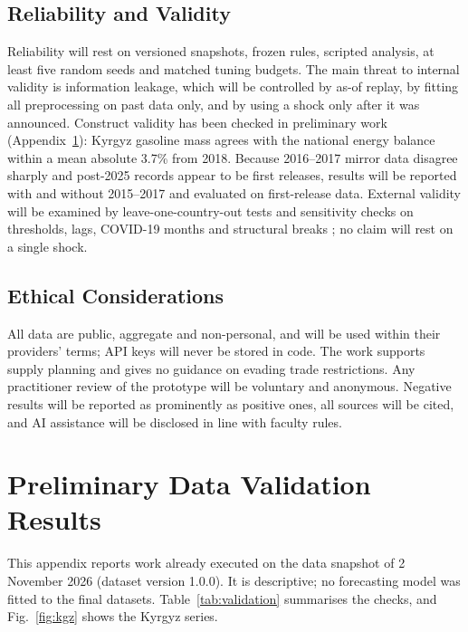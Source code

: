 \documentclass[conference]{IEEEtran}
\begin{document}
\subsection{Reliability and Validity}
Reliability will rest on versioned snapshots, frozen rules, scripted analysis, at least five random seeds and matched tuning budgets. The main threat to internal validity is information leakage, which will be controlled by as-of replay, by fitting all preprocessing on past data only, and by using a shock only after it was announced. Construct validity has been checked in preliminary work (Appendix~\ref{app:validation}): Kyrgyz gasoline mass agrees with the national energy balance within a mean absolute 3.7\% from 2018. Because 2016--2017 mirror data disagree sharply and post-2025 records appear to be first releases, results will be reported with and without 2015--2017 and evaluated on first-release data. External validity will be examined by leave-one-country-out tests and sensitivity checks on thresholds, lags, COVID-19 months and structural breaks \cite{bai2003}; no claim will rest on a single shock.

\subsection{Ethical Considerations}
All data are public, aggregate and non-personal, and will be used within their providers' terms; API keys will never be stored in code. The work supports supply planning and gives no guidance on evading trade restrictions. Any practitioner review of the prototype will be voluntary and anonymous. Negative results will be reported as prominently as positive ones, all sources will be cited, and AI assistance will be disclosed in line with faculty rules.

\FloatBarrier
\appendices

\section{Preliminary Data Validation Results}\label{app:validation}
This appendix reports work already executed on the data snapshot of 2 November 2026 (dataset version 1.0.0). It is descriptive; no forecasting model was fitted to the final datasets. Table~\ref{tab:validation} summarises the checks, and Fig.~\ref{fig:kgz} shows the Kyrgyz series.
\end{document}
